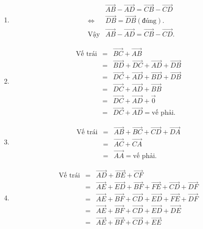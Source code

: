 \begin{bt}
{\begin{enumerate}
\begin{eqnarray*}
			\end{eqnarray*}
			\item \begin{eqnarray*}
				& &\overrightarrow{AB}-\overrightarrow{AD}=\overrightarrow{CB}-\overrightarrow{CD}\\
				&\Leftrightarrow& \overrightarrow{DB}=\overrightarrow{DB} (\text{đúng}).\\
				&\text{Vậy}& \overrightarrow{AB}-\overrightarrow{AD}=\overrightarrow{CB}-\overrightarrow{CD}.	
			\end{eqnarray*}
			\item \begin{eqnarray*}
				\text{Vế trái}
				&=&\overrightarrow{BC}+\overrightarrow{AB}\\
				&=&\overrightarrow{BD}+\overrightarrow{DC}+\overrightarrow{AD}+\overrightarrow{DB}\\
				&=&\overrightarrow{DC}+\overrightarrow{AD}+\overrightarrow{BD}+\overrightarrow{DB}\\
				&=&\overrightarrow{DC}+\overrightarrow{AD}+\overrightarrow{BB}\\
				&=&\overrightarrow{DC}+\overrightarrow{AD}+\overrightarrow{0}\\
				&=&\overrightarrow{DC}+\overrightarrow{AD}=\text{vế phải}.
			\end{eqnarray*}
			\item \begin{eqnarray*}
				\text{Vế trái}
				&=&\overrightarrow{AB}+\overrightarrow{BC}+\overrightarrow{CD}+\overrightarrow{DA}\\
				&=&\overrightarrow{AC}+\overrightarrow{CA}\\
				&=&\overrightarrow{AA}=\text{vế phải}.
			\end{eqnarray*}
			\item \begin{eqnarray*}
				\text{Vế trái}
				&=&\overrightarrow{AD}+\overrightarrow{BE}+\overrightarrow{CF}\\
				&=&\overrightarrow{AE}+\overrightarrow{ED}+\overrightarrow{BF}+\overrightarrow{FE}+\overrightarrow{CD}+\overrightarrow{DF}\\
				&=&\overrightarrow{AE}+\overrightarrow{BF}+\overrightarrow{CD}+\overrightarrow{ED}+\overrightarrow{FE}+\overrightarrow{DF}\\
				&=&\overrightarrow{AE}+\overrightarrow{BF}+\overrightarrow{CD}+\overrightarrow{ED}+\overrightarrow{DE}\\
				&=&\overrightarrow{AE}+\overrightarrow{BF}+\overrightarrow{CD}+\overrightarrow{EE}\\

\end{eqnarray*}
\end{enumerate}}
\end{bt}
